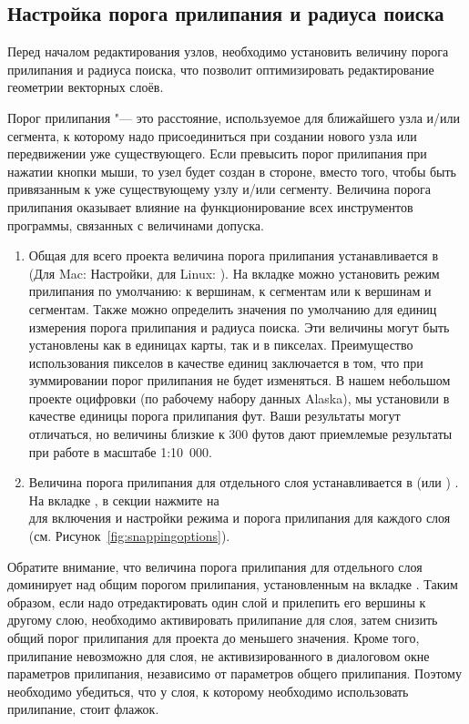 \subsection{Настройка порога прилипания и радиуса поиска}\label{snapping_tolerance}

Перед началом редактирования узлов, необходимо установить величину порога
прилипания и радиуса поиска, что позволит оптимизировать редактирование
геометрии векторных слоёв.


Порог прилипания "--- это расстояние, используемое \qg для 
ближайшего узла и/или сегмента, к которому надо присоединиться при создании
нового узла или передвижении уже существующего. Если превысить порог
прилипания \qg при нажатии кнопки мыши, то узел будет создан  в стороне,
вместо того, чтобы быть привязанным к уже существующему узлу и/или сегменту.
Величина порога прилипания оказывает влияние на функционирование всех
инструментов программы, связанных с величинами допуска.

\begin{enumerate}
\item Общая для всего проекта величина порога прилипания устанавливается в
 \arrow {}
(Для Mac: \mainmenuopt{\qg} \arrow Настройки, для Linux: 
\arrow {}).
На вкладке  можно установить режим прилипания по умолчанию: к
вершинам, к сегментам или к вершинам и сегментам. Также можно определить
значения по умолчанию для единиц измерения порога прилипания и радиуса поиска.
Эти величины  могут быть установлены как в единицах карты, так и в пикселах.
Преимущество использования пикселов в качестве единиц заключается в том, что
при зуммировании порог прилипания не будет изменяться.
В нашем небольшом проекте оцифровки (по рабочему набору данных Alaska), мы
установили в качестве единицы порога прилипания фут. Ваши результаты могут
отличаться, но величины близкие к 300 футов дают приемлемые
результаты при работе в масштабе 1:10~000.
\item Величина порога прилипания для отдельного слоя устанавливается в
 (или ) \arrow
{}. На вкладке ,
в секции  нажмите на \\
 для
включения и настройки режима и порога прилипания для каждого слоя (см.
Рисунок~\ref{fig:snappingoptions}).
\end{enumerate}
Обратите внимание, что величина порога прилипания для отдельного слоя
доминирует над общим порогом прилипания, установленным на вкладке .
Таким образом, если надо отредактировать один слой и прилепить его вершины
к другому слою, необходимо активировать прилипание 
для слоя, затем снизить общий порог прилипания для проекта до меньшего
значения. Кроме того, прилипание невозможно для слоя, не активизированного
в диалоговом окне параметров прилипания, независимо от параметров
общего прилипания. Поэтому необходимо убедиться, что у слоя, к которому
необходимо использовать прилипание, стоит флажок.

